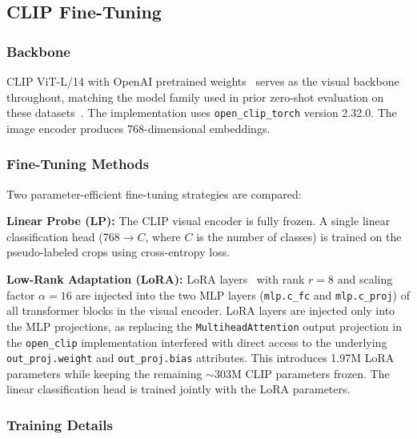 \documentclass{ieeeaccess}
\begin{document}
\subsection{CLIP Fine-Tuning}
\label{sec:finetune}

\subsubsection{Backbone}

CLIP ViT-L/14 with OpenAI pretrained
weights~\cite{radford2021learning} serves as the visual backbone
throughout,
matching the model family used in prior zero-shot evaluation on these
datasets~\cite{scb_dataset}.
The implementation uses \texttt{open\_clip\_torch} version 2.32.0.
The image encoder produces 768-dimensional embeddings.

\subsubsection{Fine-Tuning Methods}

Two parameter-efficient fine-tuning strategies are compared:

\textbf{Linear Probe (LP):} The CLIP visual encoder is fully frozen.
A single linear classification head ($768 \to C$, where $C$ is the
number of classes) is trained on the pseudo-labeled crops using
cross-entropy loss.

\textbf{Low-Rank Adaptation (LoRA):} LoRA layers~\cite{hu2022lora}
with rank $r=8$ and scaling factor $\alpha=16$ are injected into the
two MLP layers (\texttt{mlp.c\_fc} and \texttt{mlp.c\_proj}) of all
transformer blocks in the visual encoder.
LoRA layers are injected only into the MLP projections, as replacing
the \texttt{MultiheadAttention} output projection in the \texttt{open\_clip}
implementation interfered with direct access to the underlying
\texttt{out\_proj.weight} and \texttt{out\_proj.bias} attributes.
This introduces 1.97M LoRA parameters while keeping the remaining
$\sim$303M CLIP parameters frozen.
The linear classification head is trained jointly with the LoRA
parameters.

\subsubsection{Training Details}
\end{document}
